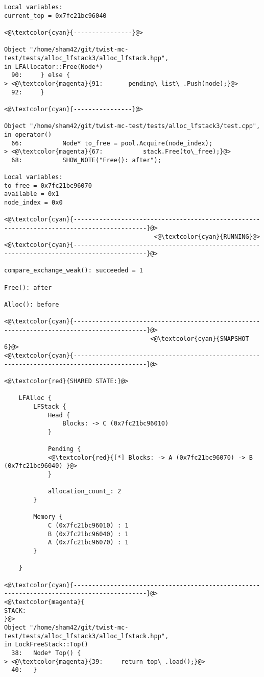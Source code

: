 \begin{adjustwidth}{-3.3cm}{-1cm}
\begin{allintypewriter}
\begin{multicols*}{2}
\begin{lstlisting}[numbers=none]
Local variables: 
current_top = 0x7fc21bc96040

<@\textcolor{cyan}{----------------}@>

Object "/home/sham42/git/twist-mc-test/tests/alloc_lfstack3/alloc_lfstack.hpp",
in LFAllocator::Free(Node*)
  90:     } else {
> <@\textcolor{magenta}{91:       pending\_list\_.Push(node);}@>
  92:     }

<@\textcolor{cyan}{----------------}@>

Object "/home/sham42/git/twist-mc-test/tests/alloc_lfstack3/test.cpp",
in operator()
  66:           Node* to_free = pool.Acquire(node_index);
> <@\textcolor{magenta}{67:           stack.Free(to\_free);}@>
  68:           SHOW_NOTE("Free(): after");

Local variables: 
to_free = 0x7fc21bc96070
available = 0x1
node_index = 0x0

<@\textcolor{cyan}{------------------------------------------------------------------------------------------}@>
                                         <@\textcolor{cyan}{RUNNING}@>
<@\textcolor{cyan}{------------------------------------------------------------------------------------------}@>

compare_exchange_weak(): succeeded = 1

Free(): after

Alloc(): before

<@\textcolor{cyan}{------------------------------------------------------------------------------------------}@>
                                        <@\textcolor{cyan}{SNAPSHOT 6}@>
<@\textcolor{cyan}{------------------------------------------------------------------------------------------}@>

<@\textcolor{red}{SHARED STATE:}@>

    LFAlloc {
	    LFStack {
		    Head {
			    Blocks: -> C (0x7fc21bc96010) 
		    }

		    Pending {
			<@\textcolor{red}{[*] Blocks: -> A (0x7fc21bc96070) -> B (0x7fc21bc96040) }@>
		    }

		    allocation_count_: 2
	    }

	    Memory {
		    C (0x7fc21bc96010) : 1
		    B (0x7fc21bc96040) : 1
		    A (0x7fc21bc96070) : 1
	    }

    }

<@\textcolor{cyan}{------------------------------------------------------------------------------------------}@>
<@\textcolor{magenta}{
STACK:
}@>
Object "/home/sham42/git/twist-mc-test/tests/alloc_lfstack3/alloc_lfstack.hpp",
in LockFreeStack::Top()
  38:   Node* Top() {
> <@\textcolor{magenta}{39:     return top\_.load();}@>
  40:   }


\end{lstlisting}
\end{multicols*}
\end{allintypewriter}
\end{adjustwidth}

